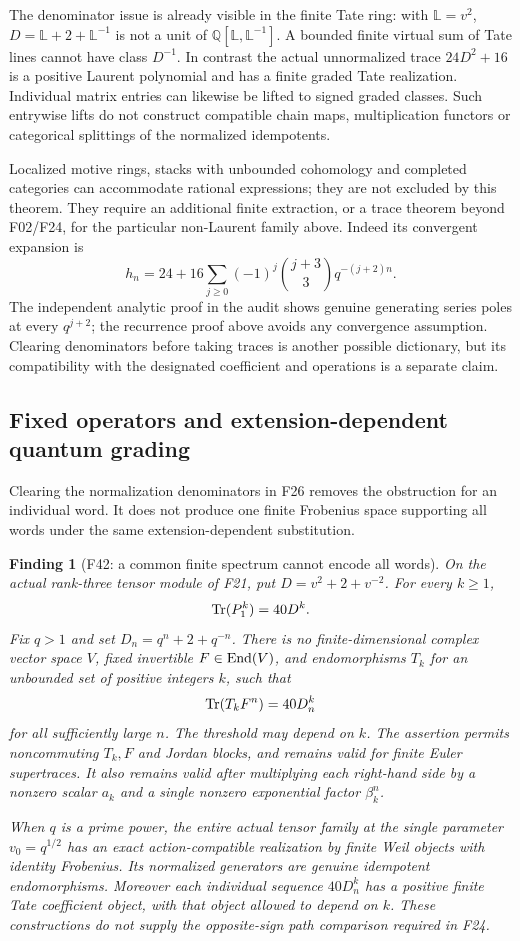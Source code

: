 \documentclass[11pt,a4paper]{article}
\newcommand{\Q}{\mathbb Q}\newcommand{\Z}{\mathbb Z}\newcommand{\C}{\mathbb C}\newcommand{\N}{\mathbb N}\newcommand{\F}{\mathbb F}
\newcommand{\fid}[1]{\textsf{#1}}\newcommand{\gate}[1]{\textsf{#1}}
\theoremstyle{named}\newtheorem{finding}{Finding}[section]
\theoremstyle{definition}\newtheorem{definition}[finding]{Definition}
\theoremstyle{remark}\newtheorem{remark}[finding]{Remark}
\begin{document}
The denominator issue is already visible in the finite Tate ring:
with $\mathbb L=v^2$, $D=\mathbb L+2+\mathbb L^{-1}$ is not a unit
of $\Q[\mathbb L,\mathbb L^{-1}]$. A bounded finite virtual sum of
Tate lines cannot have class $D^{-1}$. In contrast the actual
unnormalized trace $24D^2+16$ is a positive Laurent polynomial and
has a finite graded Tate realization. Individual matrix entries can
likewise be lifted to signed graded classes. Such entrywise lifts do
not construct compatible chain maps, multiplication functors or
categorical splittings of the normalized idempotents.

Localized motive rings, stacks with unbounded cohomology and completed
categories can accommodate rational expressions; they are not excluded
by this theorem. They require an additional finite extraction, or a
trace theorem beyond \fid{F02}/\fid{F24}, for the particular non-Laurent
family above. Indeed its convergent expansion is
\[
 h_n=24+16\sum_{j\ge0}(-1)^j\binom{j+3}{3}q^{-(j+2)n}.
\]
The independent analytic proof in the audit shows genuine generating
series poles at every $q^{j+2}$; the recurrence proof above avoids any
convergence assumption. Clearing denominators before taking traces is
another possible dictionary, but its compatibility with the designated
coefficient and operations is a separate claim.


\subsection{Fixed operators and extension-dependent quantum grading}
Clearing the normalization denominators in \fid{F26} removes
the obstruction for an individual word. It does not produce
one finite Frobenius space supporting all words under the same
extension-dependent substitution.

\begin{finding}[\fid{F42}: a common finite spectrum cannot encode all words]\label{f:commonwords}
On the actual rank-three tensor module of \fid{F21}, put
$D=v^2+2+v^{-2}$. For every $k\ge1$,
\[
 \operatorname{Tr}(P_1^k)=40D^k.
\]
Fix $q>1$ and set $D_n=q^n+2+q^{-n}$.
There is no finite-dimensional complex vector space $V$,
fixed invertible $F\in\operatorname{End}(V)$, and endomorphisms $T_k$ for
an unbounded set of positive integers $k$, such that
\[
 \operatorname{Tr}(T_kF^n)=40D_n^k
\]
for all sufficiently large $n$. The threshold may depend on $k$.
The assertion permits noncommuting $T_k,F$ and Jordan blocks,
and remains valid for finite Euler supertraces. It also remains
valid after multiplying each right-hand side by a nonzero scalar
$a_k$ and a single nonzero exponential factor $\beta_k^n$.

When $q$ is a prime power, the entire actual tensor family at the single
parameter $v_0=q^{1/2}$ has an exact action-compatible realization
by finite Weil objects with identity Frobenius. Its normalized
generators are genuine idempotent endomorphisms. Moreover each
individual sequence $40D_n^k$ has a positive finite Tate
coefficient object, with that object allowed to depend on $k$.
These constructions do not supply the opposite-sign path
comparison required in \fid{F24}.
\end{finding}
\end{document}
